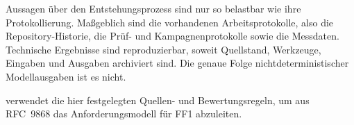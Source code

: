 Aussagen über den Entstehungsprozess sind nur so belastbar wie ihre Protokollierung. Maßgeblich sind die
vorhandenen Arbeitsprotokolle, also die Repository-Historie, die Prüf- und Kampagnenprotokolle sowie die
Messdaten. Technische Ergebnisse sind reproduzierbar, soweit Quellstand, Werkzeuge, Eingaben und Ausgaben
archiviert sind. Die genaue Folge nichtdeterministischer Modellausgaben ist es nicht.

 verwendet die hier festgelegten Quellen- und Bewertungsregeln, um aus RFC~9868 das
Anforderungsmodell für FF1 abzuleiten.
